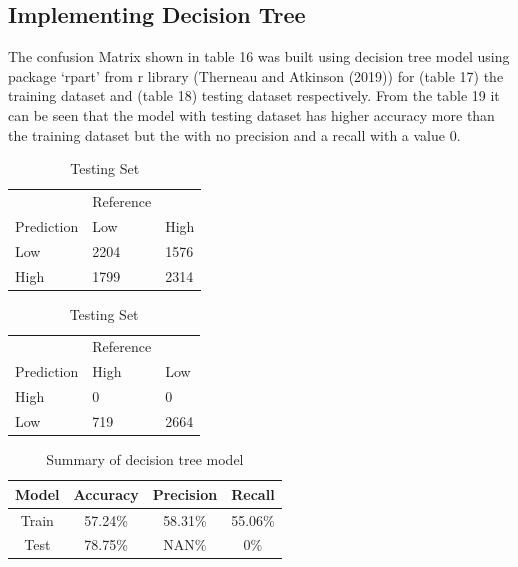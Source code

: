 \documentclass[
  a4paper,
]{article}
\begin{document}
\hypertarget{implementing-decision-tree}{%
\subsection{Implementing Decision
Tree}\label{implementing-decision-tree}}

The confusion Matrix shown in table 16 was built using decision tree
model using package `rpart' from r library (Therneau and Atkinson
(2019)) for (table 17) the training dataset and (table 18) testing
dataset respectively. From the table 19 it can be seen that the model
with testing dataset has higher accuracy more than the training dataset
but the with no precision and a recall with a value 0.

\begin{table}[!htb]
    \caption{Confusion matrix of decision tree model}
    \begin{minipage}{.5\linewidth}
      \caption{Training Set}
      \centering
        \begin{tabular}{lll}
        & Reference & \\
         Prediction  & Low & High\\
           Low & 2204 & 1576 \\
          High & 1799 & 2314  \\
        \end{tabular}
    \end{minipage}%
    \begin{minipage}{.5\linewidth}
      \centering
        \caption{Testing Set}
        \begin{tabular}{lll}
          & Reference & \\
          Prediction  & High & Low \\
           High & 0 & 0 \\
            Low & 719 & 2664\\
        \end{tabular}
    \end{minipage} 
\end{table}

\begin{table}[ht]
\caption{Summary of decision tree model} 
\centering
\begin{tabular}{c@{\hskip 0.5in}c@{\hskip 0.5in}c@{\hskip 0.5in}c@{\hskip 0.5in}}
\hline\hline
Model & Accuracy & Precision & Recall \\ [0.5ex]
\hline
Train & 57.24\% & 58.31\% & 55.06\% \\ 
Test & 78.75\% & NAN\% & 0\% \\[1ex]
\hline
\end{tabular}
\end{table}
\end{document}

